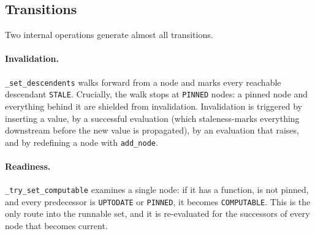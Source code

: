 \documentclass[11pt,a4paper]{article}
\newcommand{\code}[1]{\texttt{#1}}
\begin{document}
\subsection{Transitions}

Two internal operations generate almost all transitions.

\paragraph{Invalidation.} \code{\_set\_descendents} walks forward from a node
and marks every reachable descendant \code{STALE}. Crucially, the walk stops at
\code{PINNED} nodes: a pinned node and everything behind it are shielded from
invalidation. Invalidation is triggered by inserting a value, by a successful
evaluation (which staleness-marks everything downstream before the new value is
propagated), by an evaluation that raises, and by redefining a node with
\code{add\_node}.

\paragraph{Readiness.} \code{\_try\_set\_computable} examines a single node: if
it has a function, is not pinned, and every predecessor is \code{UPTODATE} or
\code{PINNED}, it becomes \code{COMPUTABLE}. This is the only route into the
runnable set, and it is re-evaluated for the successors of every node that
becomes current.
\end{document}
